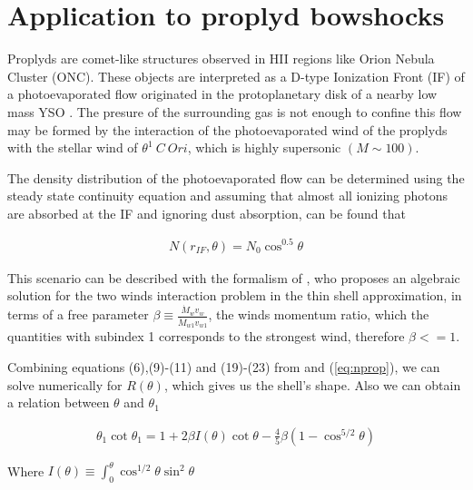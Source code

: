 \section{Application to proplyd bowshocks}
\label{sec:application}

Proplyds are comet-like structures observed in HII regions like Orion Nebula Cluster (ONC). 
These objects are interpreted as a D-type Ionization Front (IF) of a photoevaporated flow 
originated in the protoplanetary disk of a nearby low mass YSO \citep{Johnstone:1998}.
The presure of the surrounding gas is not enough to confine this flow \citep{HA:1998}
may be formed by the interaction of the photoevaporated wind of the proplyds with the stellar wind of $\theta^1~C~Ori$, which is highly supersonic $(M \sim 100)$. 

The density distribution of the photoevaporated flow can be determined using the steady state continuity equation and assuming that almost all ionizing photons are absorbed at the IF \citep{HA:1998} and ignoring dust absorption, can be found that

\begin{align}
N(r_{IF},\theta) = N_0 \cos^{0.5}\theta
\label{eq:nprop}
\end{align}

This scenario can be described with the formalism of \citep{Canto:1996}, who proposes an algebraic solution for the two winds interaction problem in the thin shell approximation, in terms of a free parameter $\beta\equiv\frac{\dot{M}_wv_w}{\dot{M}_{w1}v_{w1}}$,
the winds momentum ratio, which the quantities with subindex 1 corresponds to the strongest wind, therefore $\beta<=1$. 


 Combining equations (6),(9)-(11) and (19)-(23) from \citep{Canto:1996} and (\ref{eq:nprop}), we can solve numerically for $R(\theta)$, which gives us the shell's shape. Also we can
obtain a relation between $\theta$ and $\theta_1$

\begin{align}
\theta_1\cot\theta_1 = 1+ 2\beta I(\theta)\cot\theta - \frac{4}{5}\beta\left(1-\cos^{5/2}\theta\right)
\label{eq:th1th}
\end{align}

Where $I(\theta)\equiv \int^\theta_0 \cos^{1/2}\theta\sin^2\theta$


